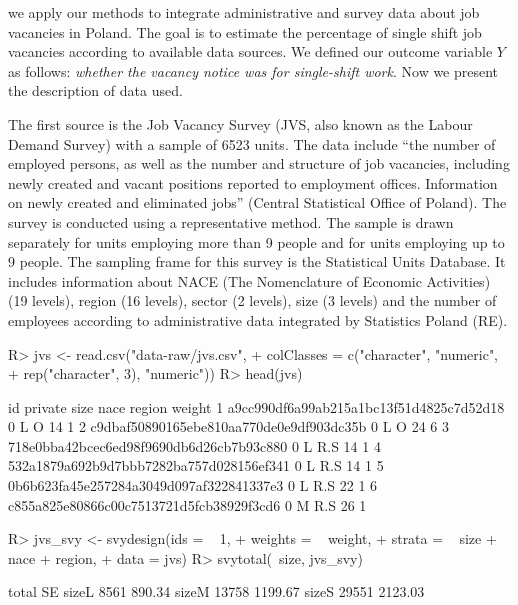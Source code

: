 \documentclass[
]{jss}
\begin{document}
we apply our methods to integrate administrative and survey data about
job vacancies in Poland. The goal is to estimate the percentage of
single shift job vacancies according to available data sources. We
defined our outcome variable \(Y\) as follows:
\textit{whether the vacancy notice was for single-shift work}. Now we
present the description of data used.

The first source is the Job Vacancy Survey (JVS, also known as the
Labour Demand Survey) with a sample of 6523 units. The data include
``the number of employed persons, as well as the number and structure of
job vacancies, including newly created and vacant positions reported to
employment offices. Information on newly created and eliminated jobs''
(Central Statistical Office of Poland). The survey is conducted using a
representative method. The sample is drawn separately for units
employing more than 9 people and for units employing up to 9 people. The
sampling frame for this survey is the Statistical Units Database. It
includes information about NACE (The Nomenclature of Economic
Activities) (19 levels), region (16 levels), sector (2 levels), size (3
levels) and the number of employees according to administrative data
integrated by Statistics Poland (RE).

\begin{CodeChunk}
\begin{CodeInput}
R> jvs <- read.csv("data-raw/jvs.csv",
+                   colClasses = c("character", "numeric",
+                                  rep("character", 3), "numeric"))
R> head(jvs)
\end{CodeInput}
\begin{CodeOutput}
                                        id private size nace region weight
1 a9cc990df6a99ab215a1bc13f51d4825c7d52d18       0    L    O     14      1
2 c9dbaf50890165ebe810aa770de0e9df903dc35b       0    L    O     24      6
3 718e0bba42bcec6ed98f9690db6d26cb7b93c880       0    L  R.S     14      1
4 532a1879a692b9d7bbb7282ba757d028156ef341       0    L  R.S     14      1
5 0b6b623fa45e257284a3049d097af322841337e3       0    L  R.S     22      1
6 c855a825e80866c00c7513721d5fcb38929f3cd6       0    M  R.S     26      1
\end{CodeOutput}
\end{CodeChunk}

\begin{CodeChunk}
\begin{CodeInput}
R> jvs_svy <- svydesign(ids = ~ 1, 
+                      weights = ~ weight,
+                      strata = ~ size + nace + region,
+                      data = jvs)
R> svytotal(~size, jvs_svy)
\end{CodeInput}
\begin{CodeOutput}
      total      SE
sizeL  8561  890.34
sizeM 13758 1199.67
sizeS 29551 2123.03
\end{CodeOutput}
\end{CodeChunk}
\end{document}
